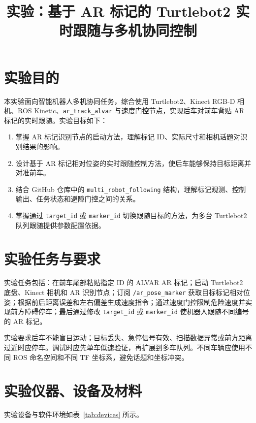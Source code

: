 \documentclass[UTF8,a4paper,12pt]{ctexart}
\title{实验：基于 AR 标记的 Turtlebot2 实时跟随与多机协同控制}
\author{}
\date{}
\begin{document}
	\maketitle

	\section{实验目的}
	本实验面向智能机器人多机协同任务，综合使用 Turtlebot2、Kinect RGB-D 相机、ROS Kinetic、\texttt{ar\_track\_alvar} 与速度门控节点，实现后车对前车背贴 AR 标记的实时跟随。实验目标如下：
	\begin{enumerate}
		\item 掌握 AR 标记识别节点的启动方法，理解标记 ID、实际尺寸和相机话题对识别结果的影响。
		\item 设计基于 AR 标记相对位姿的实时跟随控制方法，使后车能够保持目标距离并对准前车。
		\item 结合 GitHub 仓库中的 \texttt{multi\_robot\_following} 结构，理解标记观测、控制输出、任务状态和避障门控之间的关系。
		\item 掌握通过 \texttt{target\_id} 或 \texttt{marker\_id} 切换跟随目标的方法，为多台 Turtlebot2 队列跟随提供参数配置依据。
	\end{enumerate}

	\section{实验任务与要求}
	实验任务包括：在前车尾部粘贴指定 ID 的 ALVAR AR 标记；启动 Turtlebot2 底盘、Kinect 相机和 AR 识别节点；订阅 \texttt{/ar\_pose\_marker} 获取目标标记相对位姿；根据前后距离误差和左右偏差生成速度指令；通过速度门控限制危险速度并实现前方障碍停车；最后通过修改 \texttt{target\_id} 或 \texttt{marker\_id} 使机器人跟随不同编号的 AR 标记。

	实验要求后车不能盲目运动；目标丢失、急停信号有效、扫描数据异常或前方距离过近时应停车。调试时应先单车低速验证，再扩展到多车队列。不同车辆应使用不同 ROS 命名空间和不同 TF 坐标系，避免话题和坐标冲突。

	\section{实验仪器、设备及材料}
	实验设备与软件环境如表~\ref{tab:devices} 所示。
\end{document}
